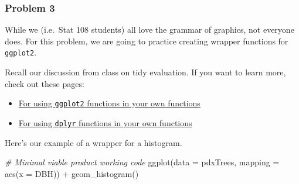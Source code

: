 \documentclass[
]{article}
\newenvironment{Shaded}{\begin{snugshade}}{\end{snugshade}}
\newcommand{\AttributeTok}[1]{\textcolor[rgb]{0.77,0.63,0.00}{#1}}
\newcommand{\CommentTok}[1]{\textcolor[rgb]{0.56,0.35,0.01}{\textit{#1}}}
\newcommand{\DecValTok}[1]{\textcolor[rgb]{0.00,0.00,0.81}{#1}}
\newcommand{\FunctionTok}[1]{\textcolor[rgb]{0.00,0.00,0.00}{#1}}
\newcommand{\NormalTok}[1]{#1}
\newcommand{\OtherTok}[1]{\textcolor[rgb]{0.56,0.35,0.01}{#1}}
\newcommand{\SpecialCharTok}[1]{\textcolor[rgb]{0.00,0.00,0.00}{#1}}
\providecommand{\tightlist}{%
  \setlength{\itemsep}{0pt}\setlength{\parskip}{0pt}}
\begin{document}
\begin{Shaded}
\end{Shaded}

\hypertarget{problem-3}{%
\subsubsection{Problem 3}\label{problem-3}}

While we (i.e.~Stat 108 students) all love the grammar of graphics, not
everyone does. For this problem, we are going to practice creating
wrapper functions for \texttt{ggplot2}.

Recall our discussion from class on tidy evaluation. If you want to
learn more, check out these pages:

\begin{itemize}
\tightlist
\item
  \href{https://ggplot2.tidyverse.org/articles/ggplot2-in-packages.html}{For
  using \texttt{ggplot2} functions in your own functions}
\item
  \href{https://dplyr.tidyverse.org/articles/programming.html}{For using
  \texttt{dplyr} functions in your own functions}
\end{itemize}

Here's our example of a wrapper for a histogram.

\begin{Shaded}
\begin{Highlighting}[]
\CommentTok{\# Minimal viable product working code}
\FunctionTok{ggplot}\NormalTok{(}\AttributeTok{data =}\NormalTok{ pdxTrees, }\AttributeTok{mapping =} \FunctionTok{aes}\NormalTok{(}\AttributeTok{x =}\NormalTok{ DBH)) }\SpecialCharTok{+}
  \FunctionTok{geom\_histogram}\NormalTok{()}
\end{Highlighting}
\end{Shaded}
\end{document}
